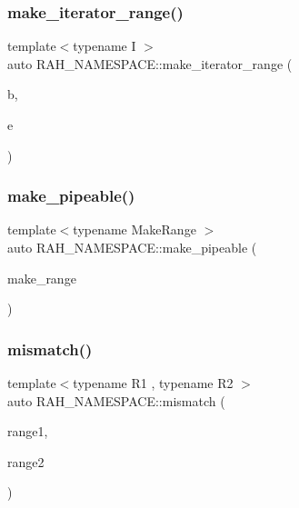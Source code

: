 \subsubsection{\texorpdfstring{make\_iterator\_range()}{make\_iterator\_range()}}
{\footnotesize\ttfamily template$<$typename I $>$ \\
auto R\+A\+H\+\_\+\+N\+A\+M\+E\+S\+P\+A\+C\+E\+::make\+\_\+iterator\+\_\+range (\begin{DoxyParamCaption}\item[{I}]{b,  }\item[{I}]{e }\end{DoxyParamCaption})}

\mbox{\label{namespace_r_a_h___n_a_m_e_s_p_a_c_e_a4f8277a9bf35f4c28d8be20d1cd4bc1b}} 
\subsubsection{\texorpdfstring{make\_pipeable()}{make\_pipeable()}}
{\footnotesize\ttfamily template$<$typename Make\+Range $>$ \\
auto R\+A\+H\+\_\+\+N\+A\+M\+E\+S\+P\+A\+C\+E\+::make\+\_\+pipeable (\begin{DoxyParamCaption}\item[{Make\+Range \&\&}]{make\+\_\+range }\end{DoxyParamCaption})}

\mbox{\label{namespace_r_a_h___n_a_m_e_s_p_a_c_e_a267247366bb3abea3e383e7dd3c5f2d7}} 
\subsubsection{\texorpdfstring{mismatch()}{mismatch()}}
{\footnotesize\ttfamily template$<$typename R1 , typename R2 $>$ \\
auto R\+A\+H\+\_\+\+N\+A\+M\+E\+S\+P\+A\+C\+E\+::mismatch (\begin{DoxyParamCaption}\item[{R1 \&\&}]{range1,  }\item[{R2 \&\&}]{range2 }\end{DoxyParamCaption})}



